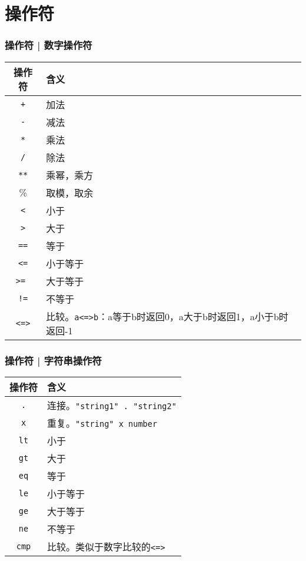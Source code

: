 \section{操作符}
\begin{frame}[fragile]
  \frametitle{操作符 | \alert{数字操作符}}
  \begin{table}
    \centering
    \begin{tabularx}{0.7\textwidth}{cX}
      \hline
      \rowcolor{blue!50}操作符 & 含义\\
      \hline
      \verb|+| & 加法\\
      \verb|-| & 减法\\
      \verb|*| & 乘法\\
      \verb|/| & 除法\\
      \verb|**| & 乘幂，乘方\\
      \% & 取模，取余\\
      \hline
      \verb|<|  & 小于\\
      \verb|>|  & 大于\\
      \verb|==|  & 等于\\
      \verb|<=|  & 小于等于\\
      \verb|>= |  & 大于等于\\
      \verb|!=|  & 不等于\\
      \verb|<=>|  & 比较。\verb|a<=>b|：a等于b时返回0，a大于b时返回1，a小于b时返回-1\\
      \hline
    \end{tabularx}
  \end{table}
\end{frame}

\begin{frame}
  \frametitle{操作符 | \alert{字符串操作符}}
  \begin{table}
    \centering
    \begin{tabularx}{0.7\textwidth}{cX}
      \hline
      \rowcolor{blue!50}操作符 & 含义\\
      \hline
      \verb|.| & 连接。\verb|"string1" . "string2"|\\
      \verb|x| & 重复。\verb|"string" x number|\\
      \verb|lt| & 小于\\
      \verb|gt| & 大于\\
      \verb|eq| & 等于\\
      \verb|le| & 小于等于\\
      \verb|ge| & 大于等于\\
      \verb|ne| & 不等于\\
      \verb|cmp| & 比较。类似于数字比较的\verb|<=>|\\
      \hline
    \end{tabularx}
  \end{table}
\end{frame}

